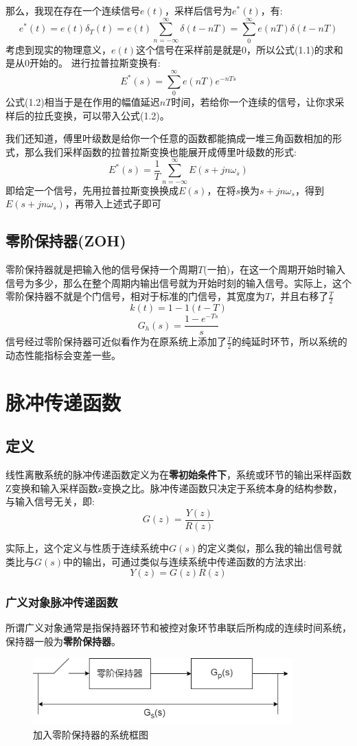\documentclass[12pt, a4paper, oneside]{ctexbook}
\begin{document}
那么，我现在存在一个连续信号$e(t)$，采样后信号为$e^*(t)$，有:
\begin{equation}
	e^*(t)=e(t)\delta_T(t)=e(t)\sum_{n=-\infty}^{\infty}\delta(t-nT)=\sum_{0}^{\infty}e(nT)\delta(t-nT)
\end{equation}
考虑到现实的物理意义，$e(t)$这个信号在采样前是就是0，所以公式(1.1)的求和是从0开始的。
进行拉普拉斯变换有:
\begin{equation}
	E^*(s)=\sum_{0}^{\infty}e(nT)e^{-nTs}
\end{equation}
公式(1.2)相当于是在作用的幅值延迟$nT$时间，若给你一个连续的信号，让你求采样后的拉氏变换，可以带入公式(1.2)。

我们还知道，傅里叶级数是给你一个任意的函数都能搞成一堆三角函数相加的形式，那么我们采样函数的拉普拉斯变换也能展开成傅里叶级数的形式:
$$
E^*(s)=\frac{1}{T}\sum_{n=-\infty}^{\infty}E(s+jn\omega_s)
$$
即给定一个信号，先用拉普拉斯变换换成$E(s)$，在将$s$换为$s+jn\omega_s$，得到$E(s+jn\omega_s)$，再带入上述式子即可
\subsection{零阶保持器(ZOH)}
零阶保持器就是把输入他的信号保持一个周期$T$(一拍)，在这一个周期开始时输入信号为多少，那么在整个周期内输出信号就为开始时刻的输入信号。实际上，这个零阶保持器不就是个门信号，相对于标准的门信号，其宽度为$T$，并且右移了$\frac{T}{2}$
$$
k(t)=1-1(t-T)
$$
$$
G_h(s)=\frac{1-e^{-Ts}}{s}
$$
信号经过零阶保持器可近似看作为在原系统上添加了$\frac{T}{2}$的纯延时环节，所以系统的动态性能指标会变差一些。
\section{脉冲传递函数}

\subsection{定义}
线性离散系统的脉冲传递函数定义为在\textbf{零初始条件下}，系统或环节的输出采样函数Z变换和输入采样函数z变换之比。脉冲传递函数只决定于系统本身的结构参数，与输入信号无关，即:
$$
G(z)=\frac{Y(z)}{R(z)}
$$

实际上，这个定义与性质于连续系统中$G(s)$的定义类似，那么我的输出信号就类比与$G(s)$中的输出，可通过类似与连续系统中传递函数的方法求出:
$$
Y(z)=G(z)R(z)
$$

\subsubsection{广义对象脉冲传递函数}
所谓广义对象通常是指保持器环节和被控对象环节串联后所构成的连续时间系统，保持器一般为\textbf{零阶保持器}。
\begin{figure}[htbp]
	\centering
	\includegraphics[width=10cm,height=2.6cm]{img/3_5.png}
	\caption{加入零阶保持器的系统框图}
\end{figure}
\end{document}
